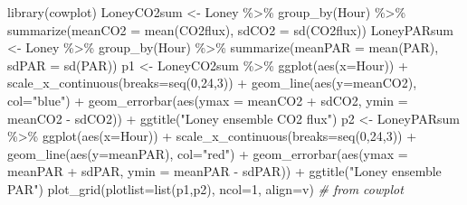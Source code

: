 \documentclass[
]{book}
\newenvironment{Shaded}{\begin{snugshade}}{\end{snugshade}}
\newcommand{\AttributeTok}[1]{\textcolor[rgb]{0.61,0.61,0.61}{#1}}
\newcommand{\CommentTok}[1]{\textcolor[rgb]{0.37,0.37,0.37}{\textit{#1}}}
\newcommand{\DecValTok}[1]{\textcolor[rgb]{0.06,0.06,0.06}{#1}}
\newcommand{\FunctionTok}[1]{\textcolor[rgb]{0,0,0}{#1}}
\newcommand{\NormalTok}[1]{#1}
\newcommand{\OtherTok}[1]{\textcolor[rgb]{0.37,0.37,0.37}{#1}}
\newcommand{\SpecialCharTok}[1]{\textcolor[rgb]{0,0,0}{#1}}
\newcommand{\StringTok}[1]{\textcolor[rgb]{0.5,0.5,0.5}{#1}}
\begin{document}
\begin{Shaded}
\begin{Highlighting}[]
\FunctionTok{library}\NormalTok{(cowplot)}
\NormalTok{LoneyCO2sum }\OtherTok{\textless{}{-}}\NormalTok{ Loney }\SpecialCharTok{\%\textgreater{}\%}
  \FunctionTok{group\_by}\NormalTok{(Hour) }\SpecialCharTok{\%\textgreater{}\%}
  \FunctionTok{summarize}\NormalTok{(}\AttributeTok{meanCO2 =} \FunctionTok{mean}\NormalTok{(CO2flux), }\AttributeTok{sdCO2 =} \FunctionTok{sd}\NormalTok{(CO2flux))}
\NormalTok{LoneyPARsum }\OtherTok{\textless{}{-}}\NormalTok{ Loney }\SpecialCharTok{\%\textgreater{}\%}
  \FunctionTok{group\_by}\NormalTok{(Hour) }\SpecialCharTok{\%\textgreater{}\%}
  \FunctionTok{summarize}\NormalTok{(}\AttributeTok{meanPAR =} \FunctionTok{mean}\NormalTok{(PAR), }\AttributeTok{sdPAR =} \FunctionTok{sd}\NormalTok{(PAR))}
\NormalTok{p1 }\OtherTok{\textless{}{-}}\NormalTok{ LoneyCO2sum }\SpecialCharTok{\%\textgreater{}\%} \FunctionTok{ggplot}\NormalTok{(}\FunctionTok{aes}\NormalTok{(}\AttributeTok{x=}\NormalTok{Hour)) }\SpecialCharTok{+} \FunctionTok{scale\_x\_continuous}\NormalTok{(}\AttributeTok{breaks=}\FunctionTok{seq}\NormalTok{(}\DecValTok{0}\NormalTok{,}\DecValTok{24}\NormalTok{,}\DecValTok{3}\NormalTok{)) }\SpecialCharTok{+}
  \FunctionTok{geom\_line}\NormalTok{(}\FunctionTok{aes}\NormalTok{(}\AttributeTok{y=}\NormalTok{meanCO2), }\AttributeTok{col=}\StringTok{"blue"}\NormalTok{) }\SpecialCharTok{+} 
  \FunctionTok{geom\_errorbar}\NormalTok{(}\FunctionTok{aes}\NormalTok{(}\AttributeTok{ymax =}\NormalTok{ meanCO2 }\SpecialCharTok{+}\NormalTok{ sdCO2, }\AttributeTok{ymin =}\NormalTok{ meanCO2 }\SpecialCharTok{{-}}\NormalTok{ sdCO2)) }\SpecialCharTok{+}
  \FunctionTok{ggtitle}\NormalTok{(}\StringTok{"Loney ensemble CO2 flux"}\NormalTok{)}
\NormalTok{p2 }\OtherTok{\textless{}{-}}\NormalTok{  LoneyPARsum }\SpecialCharTok{\%\textgreater{}\%} \FunctionTok{ggplot}\NormalTok{(}\FunctionTok{aes}\NormalTok{(}\AttributeTok{x=}\NormalTok{Hour)) }\SpecialCharTok{+} \FunctionTok{scale\_x\_continuous}\NormalTok{(}\AttributeTok{breaks=}\FunctionTok{seq}\NormalTok{(}\DecValTok{0}\NormalTok{,}\DecValTok{24}\NormalTok{,}\DecValTok{3}\NormalTok{)) }\SpecialCharTok{+}
  \FunctionTok{geom\_line}\NormalTok{(}\FunctionTok{aes}\NormalTok{(}\AttributeTok{y=}\NormalTok{meanPAR), }\AttributeTok{col=}\StringTok{"red"}\NormalTok{) }\SpecialCharTok{+} 
  \FunctionTok{geom\_errorbar}\NormalTok{(}\FunctionTok{aes}\NormalTok{(}\AttributeTok{ymax =}\NormalTok{ meanPAR }\SpecialCharTok{+}\NormalTok{ sdPAR, }\AttributeTok{ymin =}\NormalTok{ meanPAR }\SpecialCharTok{{-}}\NormalTok{ sdPAR)) }\SpecialCharTok{+}
  \FunctionTok{ggtitle}\NormalTok{(}\StringTok{"Loney ensemble PAR"}\NormalTok{)}
\FunctionTok{plot\_grid}\NormalTok{(}\AttributeTok{plotlist=}\FunctionTok{list}\NormalTok{(p1,p2), }\AttributeTok{ncol=}\DecValTok{1}\NormalTok{, }\AttributeTok{align=}\StringTok{\textquotesingle{}v\textquotesingle{}}\NormalTok{) }\CommentTok{\# from cowplot}
\end{Highlighting}
\end{Shaded}
\end{document}
